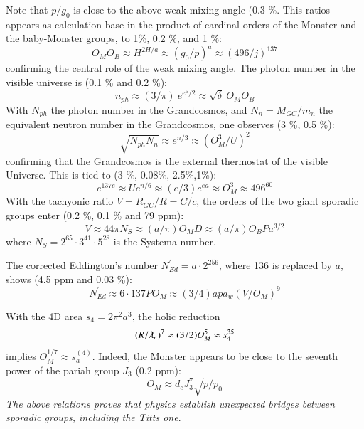 \documentclass[twoside,draft]{article}
\begin{document}
\begin{sloppypar}
Note that $p/g_0$ is close to the above weak mixing angle (0.3 \%. This ratios appears as calculation base in the product of cardinal orders of the Monster and the baby-Monster groups, to 1\%, 0.2 \%, and 1 \%:
\begin{equation}
O_MO_B\approx H^{2H/a} \approx (g_0/p)^a \approx (496/j)^{137}
\end{equation}
confirming the central role of the weak mixing angle.  The photon number in the visible universe is (0.1 \% and 0.2 \%):
\begin{equation}
n_{ph} \approx (3/\pi)~ e^{e^6/2} \approx \sqrt{\delta}~ O_M O_B
\end{equation}
With $N_{ph}$ the photon number in the Grandcosmos, and $N_n = M_{GC}/m_n$ the equivalent neutron number in the Grandcosmos, one observes (3 \%, 0.5 \%):
\begin{equation}
\sqrt{N_{ph}N_n} \approx e^{n/3} \approx (O_M^3/U)^2  
\end{equation}
confirming that the Grandcosmos is the external thermostat of the visible Universe. This is tied to (3 \%, 0.08\%, 2.5\%,1\%):
\begin{equation}
e^{137e}\approx Ue^{n/6}\approx (e/3)e^{ea}\approx O_M^3 \approx 496^{60} 
\end{equation}
With the tachyonic ratio $V = R_{GC}/R = C/c$, the orders of the two giant sporadic groups enter (0.2 \%, 0.1 \% and 79 ppm):
\begin{equation}
V \approx 44 \pi N_{S} \approx (a/\pi) O_M D \approx (a/\pi) O_B P a^{3/2}
\end{equation}
where $N_S = 2^{65} \cdot 3^{41} \cdot 5^{28}$ is the Systema number\cite{Moulin}.

The corrected Eddington's number $N_{Ed}^{\prime} = a \cdot 2^{256}$, where 136 is replaced by $a$, shows (4.5 ppm and 0.03 \%):
\begin{equation}
N_{Ed}^{\prime} \approx 6 \cdot 137PO_M \approx (3/4) a p a_w (V/O_M)^9
\end{equation}

With the 4D area $ s_4 = 2\pi^2 a^3$, the holic reduction  
\begin{equation}
(R/\lambdabar_e)^7 \approx (3/2) O_M^5 \approx s_4^{35} 
\end{equation}
implies $O_M^{1/7} \approx s_a^{(4)}$. Indeed, the Monster appears to be close to the seventh power of the pariah group $J_3$ (0.2 ppm): 
\begin{equation}
O_M \approx d_e J_3^7 \sqrt{p/p_0}
\end{equation}
\textit{The above relations proves that physics establish unexpected bridges between sporadic groups, including the Titts one}.


\end{sloppypar}
\end{document}
